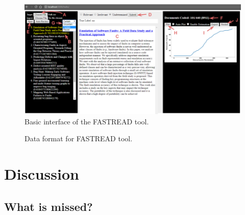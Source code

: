 \documentclass{svjour3}
\theoremstyle{break}
\begin{document}
\begin{figure}[!t]
    \centering
    \includegraphics[width=\linewidth]{FASTREAD.png}
    \caption{Basic interface of the FASTREAD tool.}
    \label{fig:FASTREAD}
\end{figure}


\begin{figure}[!t]
    \centering
    
    \caption{Data format for FASTREAD tool.}
    \label{fig:csv}
\end{figure}

\section{Discussion}
\label{sect: Discussions}

\subsection{What is missed?}
\end{document}
